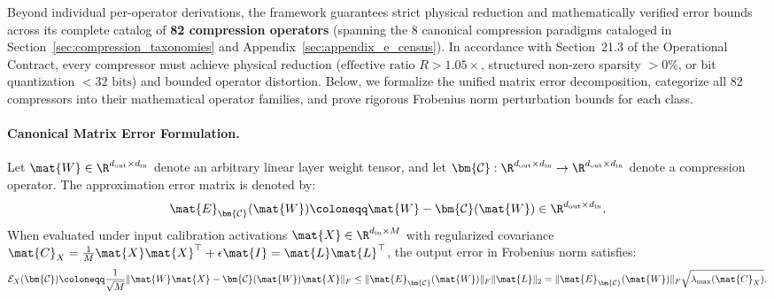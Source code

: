 Beyond individual per-operator derivations, the \neuralops{} framework guarantees strict physical reduction and mathematically verified error bounds across its complete catalog of \textbf{82 compression operators} (spanning the 8 canonical compression paradigms cataloged in Section~\ref{sec:compression_taxonomies} and Appendix~\ref{sec:appendix_e_census}). In accordance with Section~21.3 of the \neuralops{} Operational Contract, every compressor must achieve physical reduction ($\text{effective ratio } R > 1.05\times$, structured non-zero sparsity $> 0\%$, or bit quantization $< 32\text{ bits}$) and bounded operator distortion. Below, we formalize the unified matrix error decomposition, categorize all 82 compressors into their mathematical operator families, and prove rigorous Frobenius norm perturbation bounds for each class.

\paragraph{Canonical Matrix Error Formulation.}
Let $\mat{W} \in \R^{d_{\text{out}} \times d_{\text{in}}}$ denote an arbitrary linear layer weight tensor, and let $\bm{\mathcal{C}}: \R^{d_{\text{out}} \times d_{\text{in}}} \to \R^{d_{\text{out}} \times d_{\text{in}}}$ denote a compression operator. The approximation error matrix is denoted by:
\begin{equation}
\mat{E}_{\bm{\mathcal{C}}}(\mat{W}) \coloneqq \mat{W} - \bm{\mathcal{C}}(\mat{W}) \in \R^{d_{\text{out}} \times d_{\text{in}}}.
\label{eq:compressor_error_matrix_def}
\end{equation}
When evaluated under input calibration activations $\mat{X} \in \R^{d_{\text{in}} \times M}$ with regularized covariance $\mat{C}_X = \frac{1}{M}\mat{X}\mat{X}^\top + \epsilon \mat{I} = \mat{L}\mat{L}^\top$, the output error in Frobenius norm satisfies:
\begin{equation}
\mathcal{E}_X(\bm{\mathcal{C}}) \coloneqq \frac{1}{\sqrt{M}} \|\mat{W}\mat{X} - \bm{\mathcal{C}}(\mat{W})\mat{X}\|_F \le \|\mat{E}_{\bm{\mathcal{C}}}(\mat{W})\|_F \|\mat{L}\|_2 = \|\mat{E}_{\bm{\mathcal{C}}}(\mat{W})\|_F \sqrt{\lambda_{\max}(\mat{C}_X)}.
\label{eq:compressor_output_error_bound}
\end{equation}

